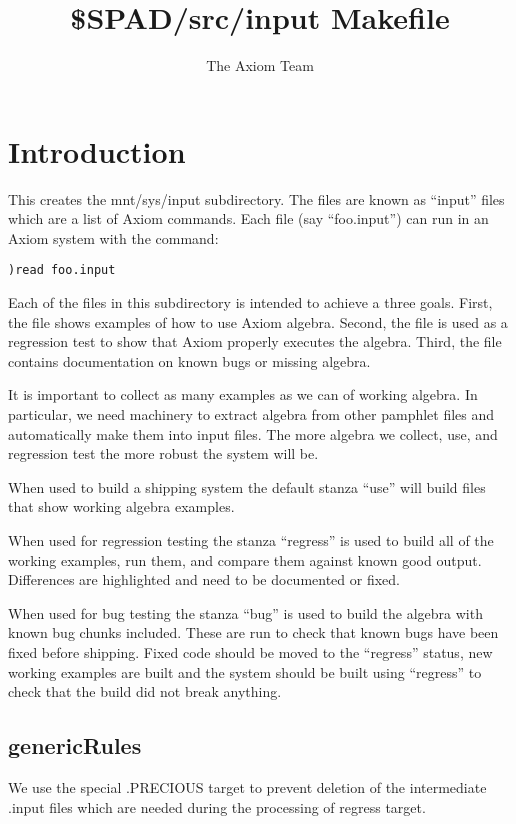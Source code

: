 \documentclass{article}
\title{\$SPAD/src/input Makefile}
\author{The Axiom Team}
\begin{document}
\maketitle

\begin{abstract}
\end{abstract}
\eject

\tableofcontents
\eject

\section{Introduction}
This creates the mnt/sys/input subdirectory. The files are known
as ``input'' files which are a list of Axiom commands. Each file
(say ``foo.input'') can run in an Axiom system with the command:
\begin{verbatim}
)read foo.input
\end{verbatim}

Each of the files in this subdirectory is intended to achieve a
three goals. First, the file shows examples of how to use Axiom
algebra. Second, the file is used as a regression test to show
that Axiom properly executes the algebra. Third, the file contains
documentation on known bugs or missing algebra.

It is important to collect as many examples as we can of working
algebra. In particular, we need machinery to extract algebra from
other pamphlet files and automatically make them into input files.
The more algebra we collect, use, and regression test the more
robust the system will be.

When used to build a shipping system the default stanza ``use''
will build files that show working algebra examples.

When used for regression testing the stanza ``regress'' is used
to build all of the working examples, run them, and compare them
against known good output. Differences are highlighted and need
to be documented or fixed.

When used for bug testing the stanza ``bug'' is used to build
the algebra with known bug chunks included. These are run to check
that known bugs have been fixed before shipping. Fixed code should
be moved to the ``regress'' status, new working examples are built
and the system should be built using ``regress'' to check that the
build did not break anything.

\subsection{genericRules}
We use the special .PRECIOUS target to prevent deletion of the
intermediate .input files which are needed during the processing of
regress target.
\end{document}
